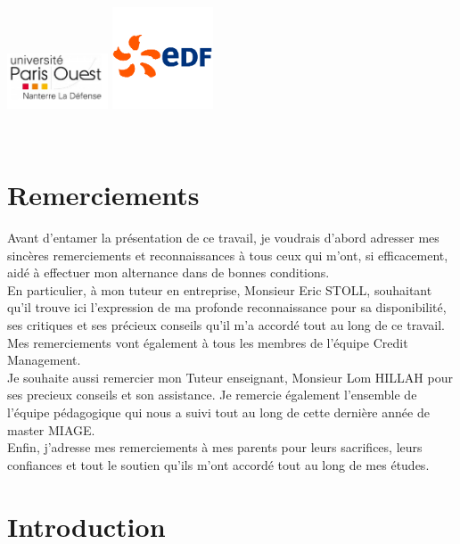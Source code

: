 \documentclass[11pt,a4paper]{article}
\begin{document}
\begin{titlepage}
\vfill
\includegraphics[width=3cm]{upond.PNG} 
\hfill 
\includegraphics[width=3cm]{logo_edf_carre.png} 
\end{titlepage}

~
\thispagestyle{empty}
\newpage


\newpage
\section*{Remerciements}
\thispagestyle{empty}
Avant d’entamer la présentation de ce travail, je voudrais d’abord adresser mes sincères remerciements et reconnaissances à tous ceux qui m’ont, si efficacement, aidé à effectuer
mon alternance dans de bonnes conditions.\\

En particulier, à mon tuteur en entreprise, Monsieur Eric STOLL, souhaitant qu’il trouve ici l’expression de ma profonde reconnaissance pour sa disponibilité, ses critiques et ses précieux conseils qu’il m’a accordé tout au long de ce travail.
Mes remerciements vont également à tous les membres de l’équipe Credit Management.\\

Je souhaite aussi remercier mon Tuteur enseignant, Monsieur Lom HILLAH pour ses precieux conseils et son assistance. Je   remercie également l’ensemble de l’équipe pédagogique qui nous a suivi tout au long de cette dernière année de master MIAGE.\\

Enfin, j'adresse mes remerciements à mes parents pour leurs sacrifices, leurs confiances et tout le soutien qu'ils m'ont accordé tout au long  de mes études. \\


\newpage
\setcounter{page}{1}
\section*{Introduction}
\end{document}
